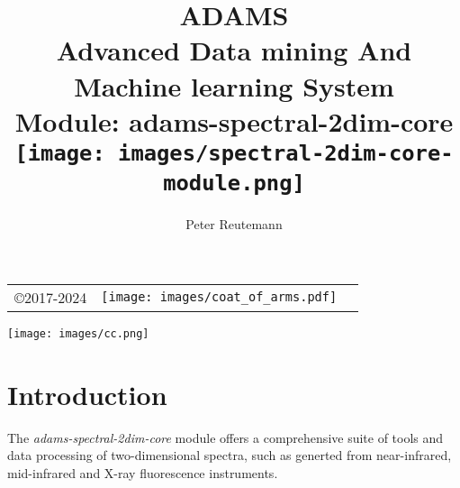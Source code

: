 \documentclass[a4paper]{book}
\title{
  \textbf{ADAMS} \\
  {\Large \textbf{A}dvanced \textbf{D}ata mining \textbf{A}nd \textbf{M}achine
  learning \textbf{S}ystem} \\
  {\Large Module: adams-spectral-2dim-core} \\
  \vspace{1cm}
  \texttt{[image: images/spectral-2dim-core-module.png]} \\
}
\author{
  Peter Reutemann
}
\begin{document}
\begin{titlepage}
\maketitle

\thispagestyle{empty}
\center
\begin{table}[b]
	\begin{tabular}{c l l}
		\parbox[c][2cm]{2cm}{\copyright 2017-2024} &
		\parbox[c][2cm]{5cm}{\texttt{[image: images/coat\_of\_arms.pdf]}} \\
	\end{tabular}
	\texttt{[image: images/cc.png]} \\
\end{table}

\end{titlepage}

\tableofcontents
\listoffigures

\chapter{Introduction}
The \textit{adams-spectral-2dim-core} module offers a comprehensive suite
of tools and data processing of two-dimensional spectra, such as generted from
near-infrared\cite{nir}, mid-infrared\cite{mir} and X-ray fluorescence\cite{xrf}
instruments.

\end{document}

